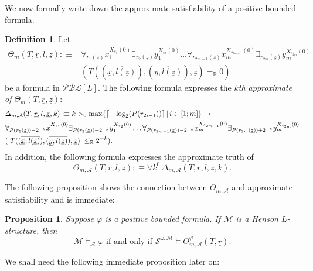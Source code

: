 \documentclass[11pt]{amsart}
\newtheorem{proposition}[theorem]{Proposition}
\theoremstyle{definition}
\newtheorem{definition}[theorem]{Definition}
\theoremstyle{remark}
\DeclarePairedDelimiter{\ceil}{\lceil}{\rceil}
\def\RR{\mathbb{R}}
\begin{document}
We now formally write down the approximate satisfiability of a positive bounded formula.

\begin{definition}
Let
\begin{align*}
    \Theta_m(T,\underline{r},l,\underline{z}):\equiv &\forall_{r_1(\underline{z})} x_1^{X_{s_1}(0)} \exists_{r_2(\underline{z})} y_1^{X_{s_2}(0)} \ldots \forall_{r_{2m-1}(\underline{z})} x_m^{X_{s_{2m-1}}(0)}\exists_{r_{2m}(\underline{z})} y_m^{X_{s_{2m}}(0)}\\&(T((\overline{\underline{x},l(\underline{z})}),(\overline{\underline{y},l(\underline{z})}),\underline{z})=_\RR 0)
\end{align*}
be a formula in $\mathcal{PBL}[L]$. The following formula expresses the \emph{$k$th approximate of} $\Theta_m(T,\underline{r},\underline{z})$:
 \begin{align*}
          &\Delta_{m,\mathcal{A}}(T,\underline{r},l,\underline{z},k):\equiv k>_0\max\{\ceil{-\log_2(P(r_{2i-1}))}\,|\, i \in [1;m]\} \to\\ &\forall_{P(r_1(\underline{z}))-2^{-k}} x_1^{X_{s_1}(0)} \exists_{P(r_2(\underline{z}))+2^{-k}} y_1^{X_{s_2}(0)} \ldots \forall_{P(r_{2m-1}(\underline{z}))-2^{-k}} x_m^{X_{s_{2m-1}}(0)}\exists_{P(r_{2m}(\underline{z}))+2^{-k}} y_m^{X_{s_{2m}}(0)}\\&(|T((\overline{\underline{x},l(\underline{z})}),(\overline{\underline{y},l(\underline{z})}),\underline{z})|\le_\RR 2^{-k}).
    \end{align*} 
In addition, the following formula expresses the approximate truth of
\[
\Theta_{m,\mathcal{A}}(T,\underline{r},l,\underline{z}):\equiv \forall k^0\,\Delta_{m,\mathcal{A}}(T,\underline{r},l,\underline{z},k).
\]
\end{definition}
The following proposition shows the connection between $\Theta_{m,\mathcal{A}}$ and approximate satisfiability and is immediate:

\begin{proposition}
\label{prop:approx:equiv}
    Suppose $\varphi$ is a positive bounded formula. If $\mathscr{M}$ is a Henson $L$-structure, then  
    \[
    \mathscr{M} \models_\mathcal{A} \varphi \mbox{ if and only if } \mathcal{S}^{\omega,\mathscr{M}} \models \Theta_{m,\mathcal{A}}^{\varphi}(T,\underline{r}).
    \]
\end{proposition}
We shall need the following immediate proposition later on:
\end{document}
